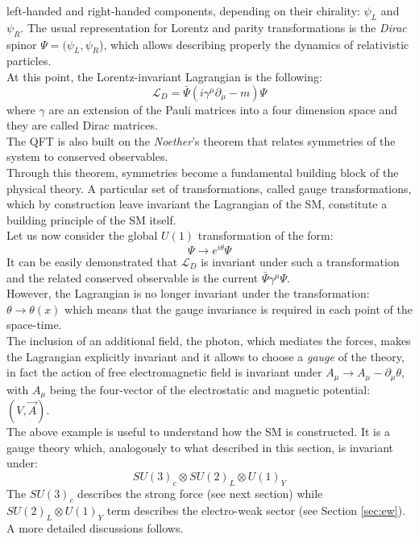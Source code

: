 left-handed and right-handed components, depending on their chirality: $\psi_{L}$ and $\psi_{R}$. The usual representation for Lorentz and 
parity transformations is the \textit{Dirac} spinor $\Psi = (\psi_{L},\psi_{R}$), which allows describing properly the dynamics of relativistic particles.
\vspace{\baselineskip}
\\At this point, the Lorentz-invariant Lagrangian is the following:
\begin{equation}
	\mathcal{L}_D  =  \bar{\Psi}(i\gamma^{\mu}\partial_{\mu}-m)\Psi
\end{equation}
where $\gamma$ are an extension of the Pauli matrices into a four dimension space and they are called Dirac matrices.
\vspace{\baselineskip}
\\The QFT is also built on the \textit{Noether}’s theorem that relates symmetries of the system to conserved observables.\\
Through this theorem, symmetries become a fundamental building block of the physical theory. 
A particular set of transformations, called gauge transformations, which by construction leave invariant the Lagrangian of the SM, 
constitute a building principle of the SM itself. 
\vspace{\baselineskip}
\\Let us now consider the global $U(1)$\footnotemark {}
transformation of the form: 
\begin{equation}
	\Psi \rightarrow e^{i\theta}\Psi
\end{equation}
It can be easily demonstrated that $\mathcal{L}_D$ is invariant under such a transformation and the related conserved observable is
the current $\bar{\Psi}\gamma^{\mu}\Psi$. \\
However, the Lagrangian is no longer invariant under the transformation: $\theta\rightarrow\theta (x)$ which means that the gauge 
invariance is required in each point of the space-time.
\\The inclusion of an additional field, the photon, which mediates the forces, makes the Lagrangian explicitly invariant and it allows
to choose a \textit{gauge} of the theory, in fact the action of free electromagnetic field is invariant under $A_{\mu}\rightarrow A_{\mu}-\partial_{\mu}\theta$,
with $A_{\mu}$ being the four-vector of the electrostatic and magnetic potential: $(V,\vec{A})$.
\vspace{\baselineskip}
\\The above example is useful to understand how the SM is constructed. It is a gauge theory which, analogously to what described in
this section, is invariant under:
\begin{equation} 
	SU(3)_{c} \otimes SU(2)_{L} \otimes U(1)_{Y}
\end{equation}
The $SU(3)_{c}$ describes the strong force (see next section) while $SU(2)_{L} \otimes U(1)_{Y}$ term describes the electro-weak sector (see Section \ref{sec:ew}). 
A more detailed discussions follows.

